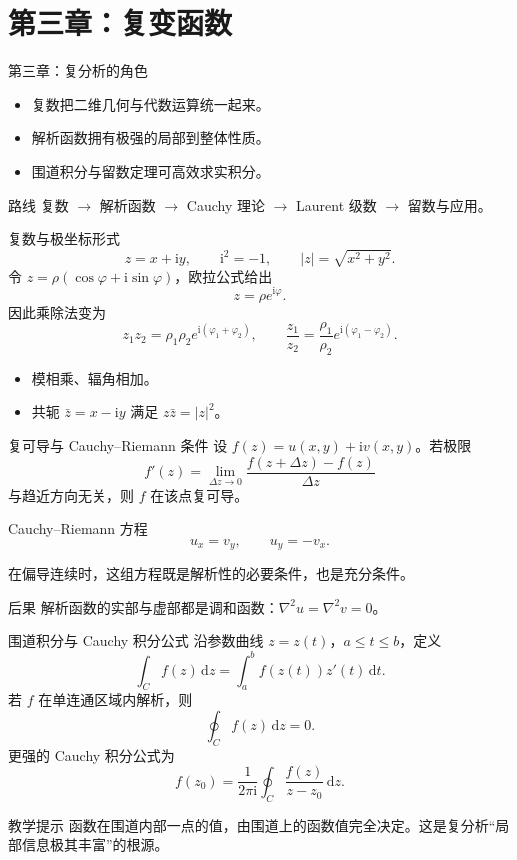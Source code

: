 \section{第三章：复变函数}

\begin{frame}{第三章：复分析的角色}
  \begin{itemize}
    \item 复数把二维几何与代数运算统一起来。
    \item 解析函数拥有极强的局部到整体性质。
    \item 围道积分与留数定理可高效求实积分。
  \end{itemize}
  \begin{block}{路线}
    复数 $\to$ 解析函数 $\to$ Cauchy 理论 $\to$ Laurent 级数 $\to$ 留数与应用。
  \end{block}
\end{frame}

\begin{frame}{复数与极坐标形式}
  \[
    z=x+\mathrm{i}y,\qquad \mathrm{i}^2=-1,
    \qquad |z|=\sqrt{x^2+y^2}.
  \]
  令 $z=\rho(\cos\varphi+\mathrm{i}\sin\varphi)$，欧拉公式给出
  \[
    z=\rho e^{\mathrm{i}\varphi}.
  \]
  因此乘除法变为
  \[
    z_1z_2=\rho_1\rho_2e^{\mathrm{i}(\varphi_1+\varphi_2)},
    \qquad
    \frac{z_1}{z_2}=\frac{\rho_1}{\rho_2}e^{\mathrm{i}(\varphi_1-\varphi_2)}.
  \]
  \begin{itemize}
    \item 模相乘、辐角相加。
    \item 共轭 $\bar z=x-\mathrm{i}y$ 满足 $z\bar z=|z|^2$。
  \end{itemize}
\end{frame}

\begin{frame}{复可导与 Cauchy--Riemann 条件}
  设 $f(z)=u(x,y)+\mathrm{i}v(x,y)$。若极限
  \[
    f'(z)=\lim_{\Delta z\to0}\frac{f(z+\Delta z)-f(z)}{\Delta z}
  \]
  与趋近方向无关，则 $f$ 在该点复可导。
  \begin{block}{Cauchy--Riemann 方程}
    \[
      u_x=v_y,\qquad u_y=-v_x.
    \]
  \end{block}
  在偏导连续时，这组方程既是解析性的必要条件，也是充分条件。
  \begin{alertblock}{后果}
    解析函数的实部与虚部都是调和函数：$\nabla^2u=\nabla^2v=0$。
  \end{alertblock}
\end{frame}

\begin{frame}{围道积分与 Cauchy 积分公式}
  沿参数曲线 $z=z(t)$，$a\leq t\leq b$，定义
  \[
    \int_C f(z)\,\mathrm{d}z=\int_a^b f(z(t))z'(t)\,\mathrm{d}t.
  \]
  若 $f$ 在单连通区域内解析，则
  \[
    \oint_C f(z)\,\mathrm{d}z=0.
  \]
  更强的 Cauchy 积分公式为
  \[
    f(z_0)=\frac{1}{2\pi\mathrm{i}}\oint_C\frac{f(z)}{z-z_0}\,\mathrm{d}z.
  \]
  \begin{block}{教学提示}
    函数在围道内部一点的值，由围道上的函数值完全决定。这是复分析“局部信息极其丰富”的根源。
  \end{block}
\end{frame}

